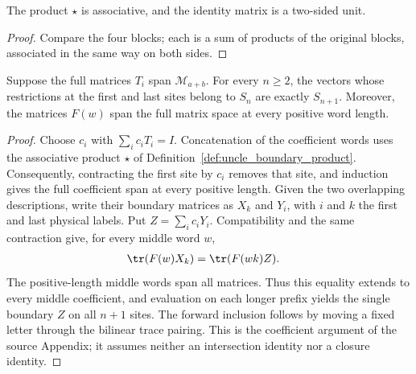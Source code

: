 \begin{lemma}
    \label{lem:uncle_boundary_product_monoid}
    \leanok
    The product $\star$ is associative, and the identity matrix is a
    two-sided unit.
\end{lemma}
\begin{proof}
    \leanok
    Compare the four blocks; each is a sum of products of the original
    blocks, associated in the same way on both sides.
\end{proof}

\begin{lemma}
    \label{lem:uncle_boundary_intersection}
    \leanok
    Suppose the full matrices $T_i$ span $\mathcal M_{a+b}$. For every
    $n\geq2$, the vectors whose restrictions at the first and last sites
    belong to $S_n$ are exactly $S_{n+1}$. Moreover, the matrices $F(w)$ span
    the full matrix space at every positive word length.
\end{lemma}
\begin{proof}
    \leanok
    Choose $c_i$ with $\sum_i c_iT_i=I$. Concatenation of the coefficient
    words uses the associative product $\star$ of
    Definition~\ref{def:uncle_boundary_product}.
    Consequently, contracting the first site by $c_i$ removes that site,
    and induction gives the full coefficient span at every positive length.
    Given the two overlapping descriptions, write their boundary matrices
    as $X_k$ and $Y_i$, with $i$ and $k$ the first and last physical labels.
    Put $Z=\sum_i c_iY_i$. Compatibility and the same contraction give, for
    every middle word $w$,
    \begin{align}
        \tr(F(w)X_k) & =\tr(F(wk)Z).
    \end{align}
    The positive-length middle words span all matrices. Thus this equality
    extends to every middle coefficient, and evaluation on each longer
    prefix yields the single boundary $Z$ on all $n+1$ sites.
    The forward inclusion follows by moving a fixed letter through the
    bilinear trace pairing. This is the coefficient argument of the source
    Appendix; it assumes neither an intersection identity nor a closure identity.
\end{proof}
